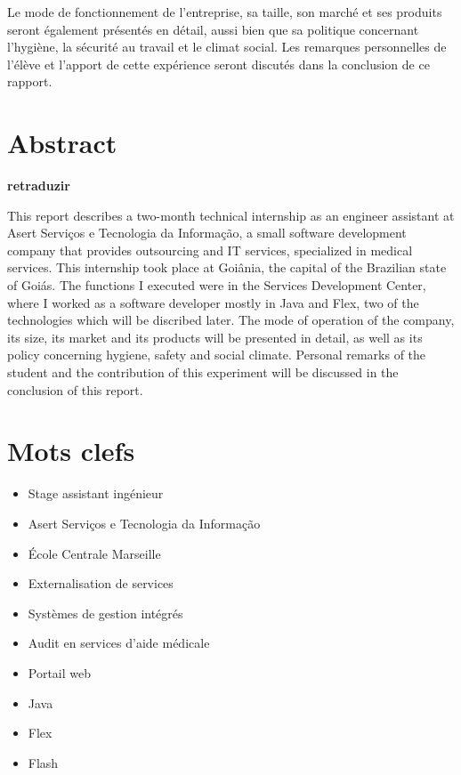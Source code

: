 Le mode de fonctionnement de l'entreprise, sa taille, son marché et ses produits seront également présentés en détail, aussi bien que sa politique concernant l'hygiène, la sécurité au travail et le climat social. Les remarques personnelles de l'élève et l'apport de cette expérience seront discutés dans la conclusion de ce rapport.

\section*{Abstract}

\begin{center}
\bfseries retraduzir
\end{center}

This report describes a two-month technical internship as an engineer assistant at Asert Serviços e Tecnologia da Informação, a small software development company that provides outsourcing and IT services, specialized in medical services. This internship took place at Goiânia, the capital of the Brazilian state of Goiás. The functions I executed were in the Services Development Center, where I worked as a software developer mostly in Java and Flex, two of the technologies which will be discribed later. The mode of operation of the company, its size, its market and its products will be presented in
detail, as well as its policy concerning hygiene, safety and social climate. Personal remarks of the student and the contribution of this experiment will be discussed in the conclusion of this report.

\section*{Mots clefs}

\begin{itemize}
\begin{itemize}
\item Stage assistant ingénieur
\item Asert Serviços e Tecnologia da Informação
\item École Centrale Marseille
\item Externalisation de services
\item Systèmes de gestion intégrés
\item Audit en services d'aide médicale
\item Portail web
\item Java
\item Flex
\item Flash
\end{itemize}
\end{itemize}

